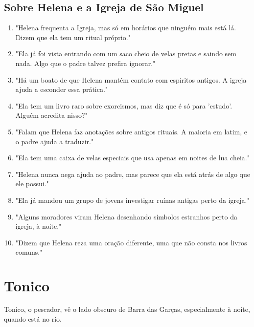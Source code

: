 \subsection*{Sobre Helena e a Igreja de São Miguel}
\begin{enumerate}
    \item "Helena frequenta a Igreja, mas só em horários que ninguém mais está lá. Dizem que ela tem um ritual próprio."
    \item "Ela já foi vista entrando com um saco cheio de velas pretas e saindo sem nada. Algo que o padre talvez prefira ignorar."
    \item "Há um boato de que Helena mantém contato com espíritos antigos. A igreja ajuda a esconder essa prática."
    \item "Ela tem um livro raro sobre exorcismos, mas diz que é só para 'estudo'. Alguém acredita nisso?"
    \item "Falam que Helena faz anotações sobre antigos rituais. A maioria em latim, e o padre ajuda a traduzir."
    \item "Ela tem uma caixa de velas especiais que usa apenas em noites de lua cheia."
    \item "Helena nunca nega ajuda ao padre, mas parece que ela está atrás de algo que ele possui."
    \item "Ela já mandou um grupo de jovens investigar ruínas antigas perto da igreja."
    \item "Alguns moradores viram Helena desenhando símbolos estranhos perto da igreja, à noite."
    \item "Dizem que Helena reza uma oração diferente, uma que não consta nos livros comuns."
\end{enumerate}

\section{Tonico}
Tonico, o pescador, vê o lado obscuro de Barra das Garças, especialmente à noite, quando está no rio.

